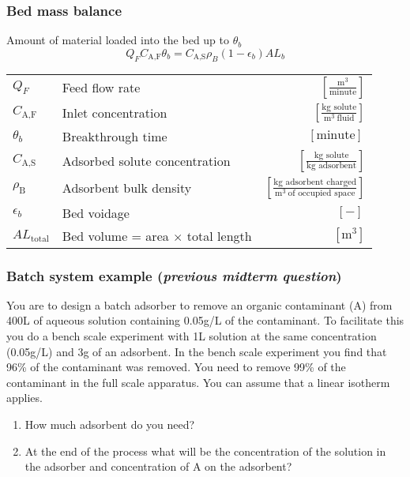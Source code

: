 \begin{frame}\frametitle{Bed mass balance}

	\begin{exampleblock}{Amount of material loaded into the bed up to $\theta_b$}
		\[Q_F C_\text{A,F} \theta_b = C_\text{A,S} \rho_B \left(1-\epsilon_b \right) A L_b \]
	\end{exampleblock}

	\begin{tabular}{llr}\vspace{6pt}
		$Q_F $					& Feed flow rate					& $\left[ \displaystyle\frac{\text{m}^3}{\text{minute}}\right]$ \\ 	\vspace{6pt}
		$C_\text{A,F} $			& Inlet concentration				& $\left[ \displaystyle\frac{\text{kg solute}}{\text{m}^3~\text{fluid}}\right]$ \\ 	\vspace{6pt}
		$\theta_b$				& Breakthrough time					& $\left[ \text{minute}\right]\,$ \\ 	\vspace{6pt}
		$C_\text{A,S}$			& Adsorbed solute concentration		& $\left[ \displaystyle\frac{\text{kg solute}}{\text{kg adsorbent}}\right]$ \\ \vspace{6pt}
		$\rho_\text{B}$			& Adsorbent bulk density			& $\left[ \displaystyle\frac{\text{kg adsorbent charged}}{\text{m}^3~\text{of occupied space}}\right]$ \\ 	\vspace{6pt}
		$\epsilon_b$			& Bed voidage						& $\left[ - \right]\,$ \\
		$A L_\text{total}$		& Bed volume = area $\times$ total length	& $\left[ \text{m}^3\right]$
	\end{tabular}

	\vspace{6pt}
	{\color{myBlue}{Use these to determine mass of adsorbent required.}}
\end{frame}

\begin{frame}\frametitle{Batch system example (\emph{previous midterm question})}
	You are to design a batch adsorber to remove an organic contaminant (A) from 400L of aqueous solution containing 0.05g/L of the contaminant. To facilitate this you do a bench scale experiment with 1L solution at the same concentration (0.05g/L) and 3g of an adsorbent. In the bench scale experiment you find that 96\% of the contaminant was removed. You need to remove 99\% of the contaminant in the full scale apparatus. You can assume that a linear isotherm applies.

	\begin{enumerate}
		\item	How much adsorbent do you need?
		\item	At the end of the process what will be the concentration of the solution in the adsorber and concentration of A on the adsorbent?
	\end{enumerate}
\end{frame}

